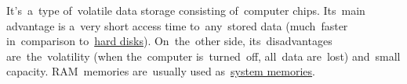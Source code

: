 \label{ram}
It's~a~type of~volatile data storage consisting of~computer chips.
Its~main advantage is a~very short access time to~any~stored data (much~faster in~comparison to~\hyperref[harddiskdrive]{hard disks}).
On~the~other side, its~disadvantages are~the~volatility (when the~computer is~turned~off, all~data are~lost) and~small capacity.
RAM~memories are~usually used as~\hyperref[systemmemory]{system memories}.
